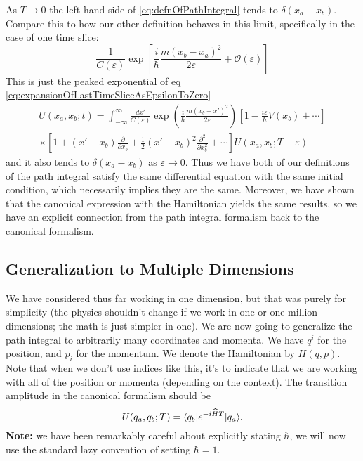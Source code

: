 As $T\to0$ the left hand side of \eqref{eq:defnOfPathIntegral}
tends to $\delta(x_a-x_b)$. Compare this to how our other
definition behaves in this limit, specifically in the case of one
time slice:
\begin{equation}%
\frac{1}{C(\varepsilon)}\exp\left[\frac{i}{\hbar}\frac{m(x_b-x_a)^{2}}{2\varepsilon}+\mathcal{O}(\varepsilon)\right]
\end{equation}
This is just the peaked exponential of eq \eqref{eq:expansionOfLastTimeSliceAsEpsilonToZero}
\begin{equation*}%
\begin{split}
U(x_a,x_b;t) =
\int^{\infty}_{-\infty}\frac{dx'}{C(\varepsilon)}\exp\left(\frac{i}{\hbar}\frac{m(x_b-x')^{2}}{2\varepsilon}\right)[1-\frac{i\varepsilon}{\hbar}V(x_b)+\cdots]\\
\times [1  + (x'- x_b)\frac{\partial}{\partial x_{b}} + \frac{1}{2}(x'- x_b)^{2}\frac{\partial^{2}}{\partial x_{b}^{2}}+\cdots]U(x_a,x_b;T-\varepsilon) 
\end{split}
\end{equation*}
and it also tends to $\delta(x_a-x_b)$ as $\varepsilon\to0$. Thus
we have both of our definitions of the path integral satisfy the
same differential equation with the same initial condition, which
necessarily implies they are the same. Moreover, we have shown
that the canonical expression with the Hamiltonian yields the
same results, so we have an explicit connection from the path
integral formalism back to the canonical formalism.

\subsection{Generalization to Multiple Dimensions} We have
considered thus far working in one dimension, but that was purely
for simplicity (the physics shouldn't change if we work in one or
one million dimensions; the math is just simpler in one). We are
now going to generalize the path integral to arbitrarily many
coordinates and momenta. We have $q^i$ for the position, and
$p_i$ for the momentum. We denote the Hamiltonian by $H(q,p).$
Note that when we don't use indices like this, it's to indicate
that we are working with all of the position or momenta
(depending on the context). The transition amplitude in the
canonical formalism should be
\begin{equation}%
U(q_a,q_b;T) = \<q_b|e^{-i\widehat{H}T}|q_a\>.
\end{equation}
\textbf{Note:} we have been remarkably careful about explicitly
stating $\hbar$, we will now use the standard lazy convention of
setting $\hbar=1$.

